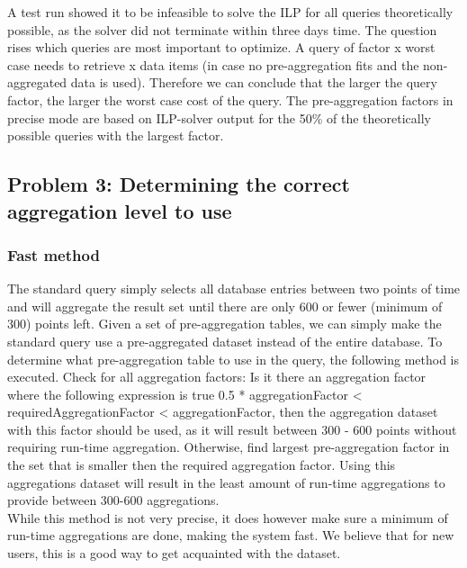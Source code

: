 A test run showed it to be infeasible to solve the ILP for all queries theoretically possible, as the solver did not terminate within three days time. The question rises which queries are most important to optimize. A query of factor x worst case needs to retrieve x data items (in case no pre-aggregation fits and the non-aggregated data is used). Therefore we can conclude that the larger the query factor, the larger the worst case cost of the query. The pre-aggregation factors in precise mode are based on ILP-solver output for the 50\% of the theoretically possible queries with the largest factor. 

\subsection{Problem 3: Determining the correct aggregation level to use}
\subsubsection{Fast method}
The standard query simply selects all database entries between two points of time and will aggregate the result set until there are only 600 or fewer (minimum of 300) points left. Given a set of pre-aggregation tables, we can simply make the standard query use a pre-aggregated dataset instead of the entire database. To determine what pre-aggregation table to use in the query, the following method is executed. Check for all aggregation factors: Is it there an aggregation factor where the following expression is true 0.5 * aggregationFactor < requiredAggregationFactor < aggregationFactor, then the aggregation dataset with this factor should be used, as it will result between 300 - 600 points without requiring run-time aggregation. Otherwise, find largest pre-aggregation factor in the set that is smaller then the required aggregation factor. Using this aggregations dataset will result in the least amount of run-time aggregations to provide between 300-600 aggregations.\\

While this method is not very precise, it does however make sure a minimum of run-time aggregations are done, making the system fast. We believe that for new users, this is a good way to get acquainted with the dataset.

